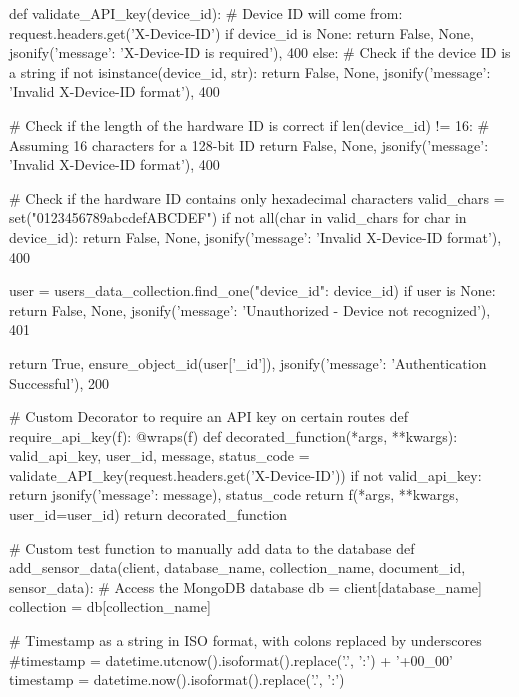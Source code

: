 \documentclass[12pt]{article} %
\begin{document}
\begin{pythoncode}[caption={Flask Backend API Code}]
        def validate_API_key(device_id):
            # Device ID will come from: request.headers.get('X-Device-ID')
            if device_id is None:
                return False, None, jsonify({'message': 'X-Device-ID is required'}), 400
            else: 
                # Check if the device ID is a string
                if not isinstance(device_id, str):
                    return False, None, jsonify({'message': 'Invalid X-Device-ID format'}), 400
                
                # Check if the length of the hardware ID is correct
                if len(device_id) != 16:  # Assuming 16 characters for a 128-bit ID
                    return False, None, jsonify({'message': 'Invalid X-Device-ID format'}), 400
        
                # Check if the hardware ID contains only hexadecimal characters
                valid_chars = set("0123456789abcdefABCDEF")
                if not all(char in valid_chars for char in device_id):
                    return False, None, jsonify({'message': 'Invalid X-Device-ID format'}), 400
        
            user = users_data_collection.find_one({"device_id": device_id})
            if user is None:
                return False, None, jsonify({'message': 'Unauthorized - Device not recognized'}), 401
            
            return True, ensure_object_id(user['_id']), jsonify({'message': 'Authentication Successful'}), 200
        
        # Custom Decorator to require an API key on certain routes
        def require_api_key(f):
            @wraps(f)
            def decorated_function(*args, **kwargs):
                valid_api_key, user_id, message, status_code = validate_API_key(request.headers.get('X-Device-ID'))
                if not valid_api_key:
                    return jsonify({'message': message}), status_code
                return f(*args, **kwargs, user_id=user_id)
            return decorated_function
            
        # Custom test function to manually add data to the database
        def add_sensor_data(client, database_name, collection_name, document_id, sensor_data):
            # Access the MongoDB database
            db = client[database_name]
            collection = db[collection_name]
            
            # Timestamp as a string in ISO format, with colons replaced by underscores
            #timestamp = datetime.utcnow().isoformat().replace('.', ':') + '+00_00'
            timestamp = datetime.now().isoformat().replace('.', ':')
    

\end{pythoncode}
\end{document}

